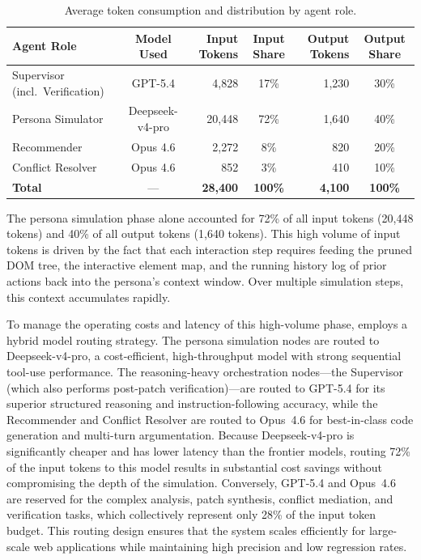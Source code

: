 \begin{table}[htbp]
  \centering
  \caption{Average token consumption and distribution by agent role.}
  \label{tab:token-consumption}
  \begin{tabular}{@{}l c r c r c@{}}
    \toprule
    \textbf{Agent Role} & \textbf{Model Used} & \textbf{Input Tokens} & \textbf{Input Share} & \textbf{Output Tokens} & \textbf{Output Share} \\
    \midrule
    Supervisor (incl.\ Verification) & GPT-5.4          & 4,828  & 17\%  & 1,230 & 30\% \\
    Persona Simulator               & Deepseek-v4-pro  & 20,448 & 72\%  & 1,640 & 40\% \\
    Recommender                     & Opus 4.6         & 2,272  & 8\%   & 820   & 20\% \\
    Conflict Resolver               & Opus 4.6         & 852    & 3\%   & 410   & 10\% \\
    \midrule
    \textbf{Total}                  & ---              & \textbf{28,400} & \textbf{100\%} & \textbf{4,100} & \textbf{100\%} \\
    \bottomrule
  \end{tabular}
\end{table}

The persona simulation phase alone accounted for 72\% of all input tokens (20,448 tokens) and 40\% of all output tokens (1,640 tokens). This high volume of input tokens is driven by the fact that each interaction step requires feeding the pruned DOM tree, the interactive element map, and the running history log of prior actions back into the persona's context window. Over multiple simulation steps, this context accumulates rapidly.

To manage the operating costs and latency of this high-volume phase, \versimux{} employs a hybrid model routing strategy. The persona simulation nodes are routed to Deepseek-v4-pro, a cost-efficient, high-throughput model with strong sequential tool-use performance. The reasoning-heavy orchestration nodes---the Supervisor (which also performs post-patch verification)---are routed to GPT-5.4 for its superior structured reasoning and instruction-following accuracy, while the Recommender and Conflict Resolver are routed to Opus~4.6 for best-in-class code generation and multi-turn argumentation. Because Deepseek-v4-pro is significantly cheaper and has lower latency than the frontier models, routing 72\% of the input tokens to this model results in substantial cost savings without compromising the depth of the simulation. Conversely, GPT-5.4 and Opus~4.6 are reserved for the complex analysis, patch synthesis, conflict mediation, and verification tasks, which collectively represent only 28\% of the input token budget. This routing design ensures that the system scales efficiently for large-scale web applications while maintaining high precision and low regression rates.

